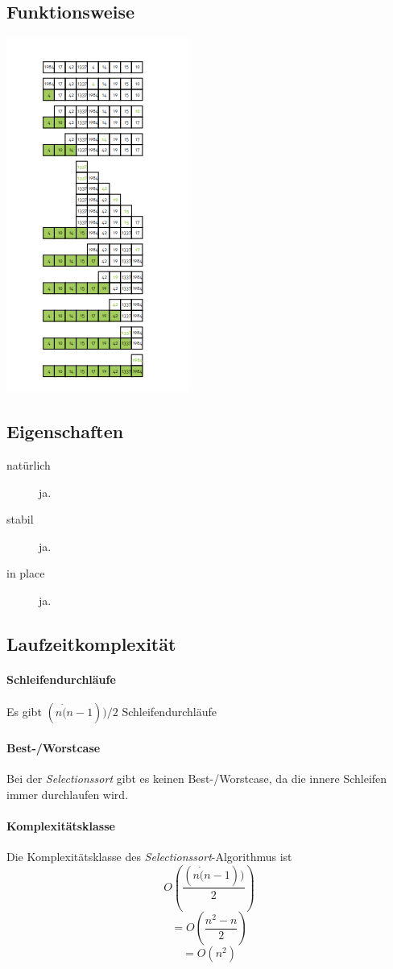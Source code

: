 \documentclass{book}
\begin{document}
\subsection{Funktionsweise}
\includegraphics[scale=0.5]{images/selectionssort.png}
\subsection{Eigenschaften}
\begin{description}
	\item[natürlich] ja.
	\item[stabil] ja.
	\item[in place] ja.
\end{description}
\subsection{Laufzeitkomplexität}
\paragraph{Schleifendurchläufe}
Es gibt $(n \dot (n-1))/2$ Schleifendurchläufe
\paragraph{Best-/Worstcase} Bei der \textit{Selectionssort} gibt es keinen Best-/Worstcase, da die innere Schleifen immer durchlaufen wird.
\paragraph{Komplexitätsklasse} Die Komplexitätsklasse des \textit{Selectionssort}-Algorithmus ist
$$O(\frac{(n \dot (n - 1))}{2})$$
$$ = O(\frac{n^{2}-n}{2})$$
$$ = O(n^{2})$$
\end{document}
